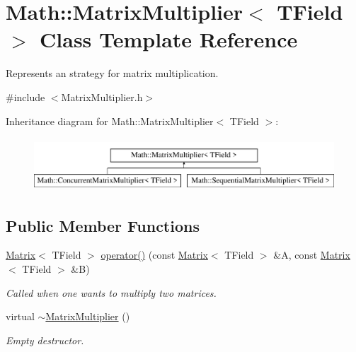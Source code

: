\hypertarget{classMath_1_1MatrixMultiplier}{}\section{Math\+:\+:Matrix\+Multiplier$<$ T\+Field $>$ Class Template Reference}
\label{classMath_1_1MatrixMultiplier}


Represents an strategy for matrix multiplication.  




{\ttfamily \#include $<$Matrix\+Multiplier.\+h$>$}

Inheritance diagram for Math\+:\+:Matrix\+Multiplier$<$ T\+Field $>$\+:\begin{figure}[H]
\begin{center}
\leavevmode
\includegraphics[height=2.000000cm]{classMath_1_1MatrixMultiplier}
\end{center}
\end{figure}
\subsection*{Public Member Functions}
\begin{DoxyCompactItemize}
\item 
\mbox{\hyperlink{classMath_1_1Matrix}{Matrix}}$<$ T\+Field $>$ \mbox{\hyperlink{classMath_1_1MatrixMultiplier_a880732c9b332798ef46e5d90f9b70625}{operator()}} (const \mbox{\hyperlink{classMath_1_1Matrix}{Matrix}}$<$ T\+Field $>$ \&A, const \mbox{\hyperlink{classMath_1_1Matrix}{Matrix}}$<$ T\+Field $>$ \&B)
\begin{DoxyCompactList}\small\item\em Called when one wants to multiply two matrices. \end{DoxyCompactList}\item 
virtual \mbox{\hyperlink{classMath_1_1MatrixMultiplier_af43501cad28dfd11f8dd73dc25edd51b}{$\sim$\+Matrix\+Multiplier}} ()
\begin{DoxyCompactList}\small\item\em Empty destructor. \end{DoxyCompactList}\end{DoxyCompactItemize}


